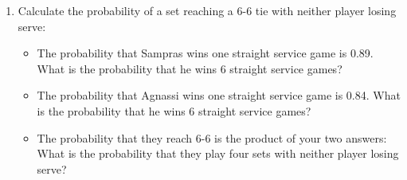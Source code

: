 \begin{enumerate}
	\item Calculate the probability of a set reaching a 6-6 tie with neither player losing serve:
	\begin{itemize}
		\item The probability that Sampras wins one straight service game is 0.89. What is the probability that he wins 6 straight service games? \underline{\vspace{1in}}
		\item The probability that Agnassi wins one straight service game is 0.84. What is the probability that he wins 6 straight service games? \underline{\vspace{1in}}
		\item The probability that they reach 6-6 is the product of your two answers:  \underline{\vspace{1in}} What is the probability that they play four sets with neither player losing serve?  \underline{\vspace{1in}}
	\end{itemize}
\end{enumerate}